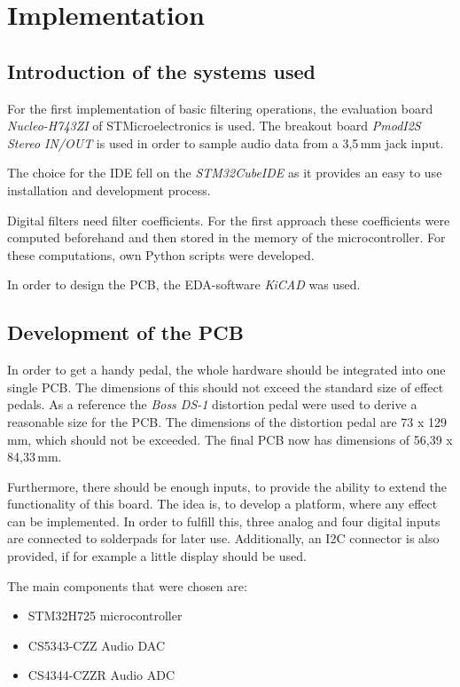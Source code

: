 \section{Implementation}

\subsection{Introduction of the systems used}

For the first implementation of basic filtering operations, the evaluation board \textit{Nucleo-H743ZI} of STMicroelectronics
is used. The breakout board \textit{PmodI2S Stereo IN/OUT} is used in order to sample audio data from a 3,5\,mm jack input.

The choice for the \ac{IDE} fell on the
\newline \textit{STM32CubeIDE} as it provides an easy to use installation and
development process.

Digital filters need filter coefficients. For the first approach these
coefficients were computed beforehand and then stored in the memory of the microcontroller. For these computations,
own Python scripts were developed.

In order to design the \ac{PCB}, the \ac{EDA}-software \textit{KiCAD} was used.

\subsection{Development of the PCB}

In order to get a handy pedal, the whole hardware should be integrated into one single \ac{PCB}.
The dimensions of this should not exceed the standard size of effect pedals. As a reference the
\textit{Boss DS-1} distortion pedal were used to derive a reasonable size for the \ac{PCB}. The dimensions of the
distortion pedal are 73 x 129\,mm, which should not be exceeded. The final \ac{PCB} now has dimensions of
56,39 x 84,33\,mm.

Furthermore, there should be enough inputs, to provide the ability to extend the functionality of this board.
The idea is, to develop a platform, where any effect can be implemented. In order to fulfill this, three analog and
four digital inputs are connected to solderpads for later use. Additionally, an \ac{I2C} connector is also
provided, if for example a little display should be used.

The main components that were chosen are:

\begin{itemize}
    \item STM32H725 microcontroller
    \item CS5343-CZZ Audio \ac{DAC}
    \item CS4344-CZZR Audio \ac{ADC}
\end{itemize}

